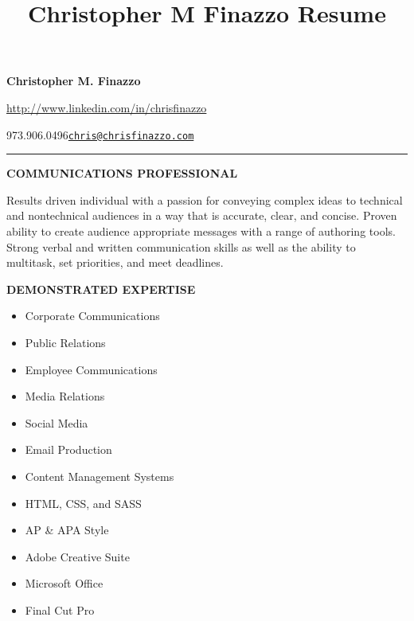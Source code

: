 \documentclass[]{article}
\title{Christopher M Finazzo Resume}
\date{}
\providecommand{\tightlist}{%
  \setlength{\itemsep}{0pt}\setlength{\parskip}{0pt}}
\begin{document}
\maketitle

\textbf{Christopher M. Finazzo}

\url{http://www.linkedin.com/in/chrisfinazzo}

{973.906.0496}{\href{mailto:chris@chrisfinazzo.com}{\nolinkurl{chris@chrisfinazzo.com}}}\\

\begin{center}\rule{0.5\linewidth}{\linethickness}\end{center}

\textbf{COMMUNICATIONS PROFESSIONAL}

Results driven individual with a passion for conveying complex ideas to
technical and nontechnical audiences in a way that is accurate, clear,
and concise. Proven ability to create audience appropriate messages with
a range of authoring tools. Strong verbal and written communication
skills as well as the ability to multitask, set priorities, and meet
deadlines.

\textbf{DEMONSTRATED EXPERTISE}

\begin{itemize}
\tightlist
\item
  Corporate Communications
\item
  Public Relations
\item
  Employee Communications
\item
  Media Relations
\end{itemize}

\begin{itemize}
\tightlist
\item
  Social Media
\item
  Email Production
\item
  Content Management Systems
\item
  HTML, CSS, and SASS
\end{itemize}

\begin{itemize}
\tightlist
\item
  AP \& APA Style
\item
  Adobe Creative Suite
\item
  Microsoft Office
\item
  Final Cut Pro
\end{itemize}

~
\end{document}
